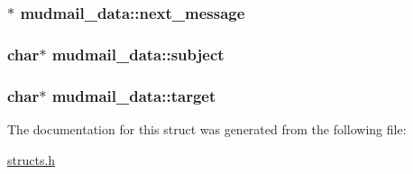 \hypertarget{structmudmail__data_ad9ea84d9aee3e14620844b27cb7fb339}{
\subsubsection[{next\-\_\-message}]{$\ast$ mudmail\-\_\-data\-::next\-\_\-message}}\label{structmudmail__data_ad9ea84d9aee3e14620844b27cb7fb339}
\hypertarget{structmudmail__data_a20c6c5399fff1a90cdac0c0b73002015}{
\subsubsection[{subject}]{\setlength{\rightskip}{0pt plus 5cm}char$\ast$ mudmail\-\_\-data\-::subject}}\label{structmudmail__data_a20c6c5399fff1a90cdac0c0b73002015}
\hypertarget{structmudmail__data_af9ab5071510e2e8cd1baabb8cce608ef}{
\subsubsection[{target}]{\setlength{\rightskip}{0pt plus 5cm}char$\ast$ mudmail\-\_\-data\-::target}}\label{structmudmail__data_af9ab5071510e2e8cd1baabb8cce608ef}


The documentation for this struct was generated from the following file\-:\begin{DoxyCompactItemize}
\item 
\hyperlink{structs_8h}{structs.\-h}\end{DoxyCompactItemize}
